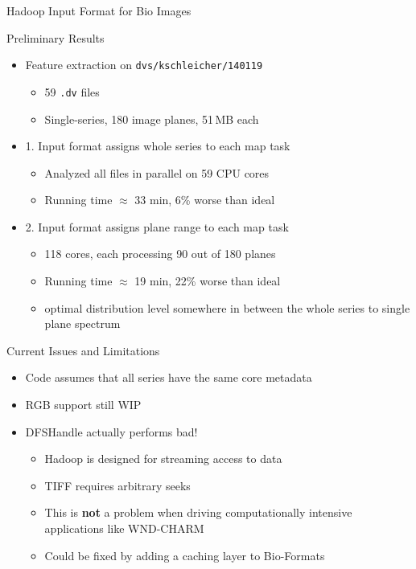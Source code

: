\documentclass[compress]{beamer}
\begin{document}
\begin{frame}{Hadoop Input Format for Bio Images}
  \begin{center}
  \end{center}
\end{frame}

\begin{frame}{Preliminary Results}
\begin{center}
  \begin{itemize}
  \item Feature extraction on \texttt{dvs/kschleicher/140119}
    \begin{itemize}
    \item 59 \texttt{.dv} files
    \item Single-series, 180 image planes, 51\,MB each
    \end{itemize}
  \item 1. Input format assigns whole series to each map task
    \begin{itemize}
    \item Analyzed all files in parallel on 59 CPU cores
    \item Running time $\approx$ 33 min, 6\% worse than ideal
    \end{itemize}
    \item 2. Input format assigns plane range to each map task
      \begin{itemize}
      \item 118 cores, each processing 90 out of 180 planes
      \item Running time $\approx$ 19 min, 22\% worse than ideal
      \item optimal distribution level somewhere in between the whole
        series to single plane spectrum
      \end{itemize}
  \end{itemize}
\end{center}
\end{frame}

\begin{frame}{Current Issues and Limitations}
\begin{center}
  \begin{itemize}
  \item Code assumes that all series have the same core metadata
  \item RGB support still WIP
  \item DFSHandle actually performs bad!
    \begin{itemize}
    \item Hadoop is designed for streaming access to data
    \item TIFF requires arbitrary seeks
    \item This is \textbf{not} a problem when driving computationally
      intensive applications like WND-CHARM
    \item Could be fixed by adding a caching layer to Bio-Formats
    \end{itemize}
  \end{itemize}
\end{center}
\end{frame}
\end{document}
